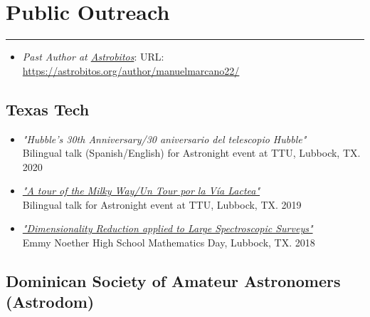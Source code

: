 \documentclass[letterpaper,10pt]{article}
\begin{document}
\section*{Public Outreach}
\hrule
\vspace{.3 cm}
\begin{itemize}[label=$\blacktriangleright$]
\item \emph{Past Author at \href{https://astrobitos.org/}{Astrobitos}}: URL: \url{https://astrobitos.org/author/manuelmarcano22/}
\end{itemize}

\subsection*{Texas Tech}

\begin{itemize}[label=$\blacktriangleright$]


	\item \textit{"Hubble's 30th Anniversary/30 aniversario del telescopio Hubble"} \\ Bilingual talk (Spanish/English) for Astronight event at TTU, Lubbock, TX. 2020


	\item \textit{\href{https://slides.com/mmarcano22/a-tour-of-the-milky-way-2\#/}{"A tour of the Milky Way/Un Tour por la V\'ia Lactea"}} \\ Bilingual talk for Astronight event at TTU, Lubbock, TX. 2019


	\item \textit{\href{http://manuelpm.me/PCASDSS/}{"Dimensionality Reduction applied to Large Spectroscopic Surveys"}} \\ Emmy Noether High School Mathematics Day, Lubbock, TX. 2018




\end{itemize}


\subsection*{Dominican Society of Amateur Astronomers (Astrodom)}
\end{document}
